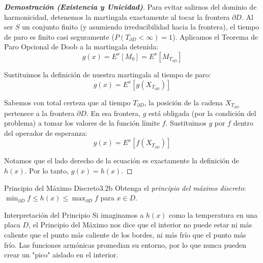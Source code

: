 \documentclass[10pt,a4paper]{article}
\begin{document}
\begin{proof}[\textbf{Demostración (Existencia y Unicidad)}]
    Para evitar salirnos del dominio de harmonicidad, detenemos la martingala exactamente al tocar la frontera $\partial D$. Al ser $S$ un conjunto finito (y asumiendo irreducibilidad hacia la frontera), el tiempo de paro es finito casi seguramente ($P(T_{\partial D} < \infty) = 1$). 
    Aplicamos el Teorema de Paro Opcional de Doob a la martingala detenida:
    \[ g(x) = E^x[M_0] = E^x[M_{T_{\partial D}}] \]
    
    Sustituimos la definición de nuestra martingala al tiempo de paro:
    \[ g(x) = E^x[g(X_{T_{\partial D}})] \]
    
    Sabemos con total certeza que al tiempo $T_{\partial D}$, la posición de la cadena $X_{T_{\partial D}}$ pertenece a la frontera $\partial D$. En esa frontera, $g$ está obligada (por la condición del problema) a tomar los valores de la función límite $f$. Sustituimos $g$ por $f$ dentro del operador de esperanza:
    \[ g(x) = E^x[f(X_{T_{\partial D}})] \]
    
    Notamos que el lado derecho de la ecuación es exactamente la definición de $h(x)$. 
    Por lo tanto, $g(x) = h(x)$. 
    
\end{proof}

\newpage

\vspace{5mm}

\begin{ejercicio}{Principio del Máximo Discreto}{3.2b}
    Obtenga el \textit{principio del máximo discreto}: $\min_{\partial D} f \le h(x) \le \max_{\partial D} f$ para $x \in D$.
\end{ejercicio}

\vspace{2mm}

\begin{nota}{Interpretación del Principio}
    Si imaginamos a $h(x)$ como la temperatura en una placa $D$, el Principio del Máximo nos dice que el interior no puede estar ni más caliente que el punto más caliente de los bordes, ni más frío que el punto más frío. Las funciones armónicas promedian su entorno, por lo que nunca pueden crear un "pico" aislado en el interior.
\end{nota}
\end{document}
